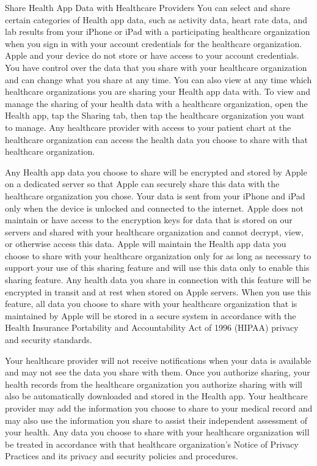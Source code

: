 Share Health App Data with Healthcare Providers
You can select and share certain categories of Health app data, such as activity data, heart rate data, and lab results from your iPhone or iPad with a participating healthcare organization when you sign in with your account credentials for the healthcare organization. Apple and your device do not store or have access to your account credentials. You have control over the data that you share with your healthcare organization and can change what you share at any time. You can also view at any time which healthcare organizations you are sharing your Health app data with. To view and manage the sharing of your health data with a healthcare organization, open the Health app, tap the Sharing tab, then tap the healthcare organization you want to manage. Any healthcare provider with access to your patient chart at the healthcare organization can access the health data you choose to share with that healthcare organization.

Any Health app data you choose to share will be encrypted and stored by Apple on a dedicated server so that Apple can securely share this data with the healthcare organization you chose. Your data is sent from your iPhone and iPad only when the device is unlocked and connected to the internet. Apple does not maintain or have access to the encryption keys for data that is stored on our servers and shared with your healthcare organization and cannot decrypt, view, or otherwise access this data. Apple will maintain the Health app data you choose to share with your healthcare organization only for as long as necessary to support your use of this sharing feature and will use this data only to enable this sharing feature. Any health data you share in connection with this feature will be encrypted in transit and at rest when stored on Apple servers. When you use this feature, all data you choose to share with your healthcare organization that is maintained by Apple will be stored in a secure system in accordance with the Health Insurance Portability and Accountability Act of 1996 (HIPAA) privacy and security standards.

Your healthcare provider will not receive notifications when your data is available and may not see the data you share with them. Once you authorize sharing, your health records from the healthcare organization you authorize sharing with will also be automatically downloaded and stored in the Health app. Your healthcare provider may add the information you choose to share to your medical record and may also use the information you share to assist their independent assessment of your health. Any data you choose to share with your healthcare organization will be treated in accordance with that healthcare organization’s Notice of Privacy Practices and its privacy and security policies and procedures.

